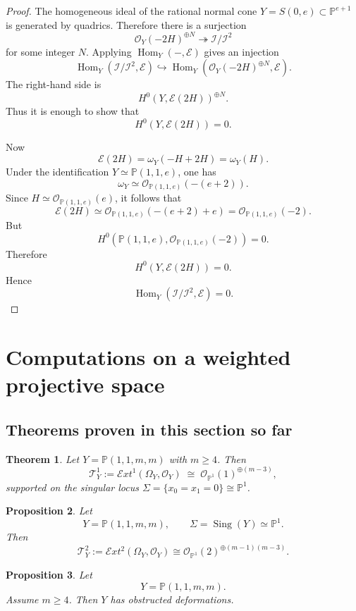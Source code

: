 \documentclass[11pt,twoside]{amsart}
\theoremstyle{plain}
\numberwithin{equation}{section}
\newtheorem{theorem}{Theorem}[section]
\newtheorem{proposition}[theorem]{Proposition}
\newcommand{\OO}{\mathcal{O}}
\newcommand{\PP}{\mathbb{P}}
\theoremstyle{definition}
\DeclareMathOperator{\Sing}{Sing}
\begin{document}
\begin{proof}
The homogeneous ideal of the rational normal cone $Y=S(0,e)\subset\mathbb{P}^{e+1}$ is generated by quadrics. Therefore there is a surjection
$$
\mathcal{O}_Y(-2H)^{\oplus N}\twoheadrightarrow \mathcal{I}/\mathcal{I}^2
$$
for some integer $N$. Applying $\operatorname{Hom}_Y(-,\mathcal{E})$ gives an injection
$$
\operatorname{Hom}_Y(\mathcal{I}/\mathcal{I}^2,\mathcal{E})
\hookrightarrow
\operatorname{Hom}_Y(\mathcal{O}_Y(-2H)^{\oplus N},\mathcal{E}).
$$
The right-hand side is
$$
H^0(Y,\mathcal{E}(2H))^{\oplus N}.
$$
Thus it is enough to show that
$$
H^0(Y,\mathcal{E}(2H))=0.
$$

Now
$$
\mathcal{E}(2H)=\omega_Y(-H+2H)=\omega_Y(H).
$$
Under the identification $Y\simeq\mathbb{P}(1,1,e)$, one has
$$
\omega_Y\simeq\mathcal{O}_{\mathbb{P}(1,1,e)}(-(e+2)).
$$
Since $H\simeq\mathcal{O}_{\mathbb{P}(1,1,e)}(e)$, it follows that
$$
\mathcal{E}(2H)
\simeq
\mathcal{O}_{\mathbb{P}(1,1,e)}(-(e+2)+e)
= \mathcal{O}_{\mathbb{P}(1,1,e)}(-2).
$$
But
$$
H^0(\mathbb{P}(1,1,e),\mathcal{O}_{\mathbb{P}(1,1,e)}(-2))=0.
$$
Therefore
$$
H^0(Y,\mathcal{E}(2H))=0.
$$
Hence
$$
\operatorname{Hom}_Y(\mathcal{I}/\mathcal{I}^2,\mathcal{E})=0.
$$
\end{proof}



\section{Computations on a weighted projective space}

\subsection{Theorems proven in this section so far}

\begin{theorem}
Let $Y = \PP(1,1,m,m)$ with $m \geq 4$. Then
\[
\mathcal{T}^1_Y:=\mathcal{E}xt^1(\Omega_Y, \OO_Y) \;\cong\; \OO_{\PP^1}(1)^{\oplus(m-3)},
\]
supported on the singular locus $\Sigma = \{x_0 = x_1 = 0\} \cong \PP^1$.
\end{theorem}

\begin{proposition}
Let
\[
Y=\PP(1,1,m,m),
\qquad
\Sigma=\Sing(Y)\simeq \PP^1.
\]
Then
\[
\mathcal{T}^2_Y:=\mathcal{E}xt^2(\Omega_Y,\OO_Y)
\cong
\OO_{\PP^1}(2)^{\oplus (m-1)(m-3)}.
\]
\end{proposition}


\begin{proposition}
Let
\[
Y=\mathbb{P}(1,1,m,m).
\]
Assume \(m\geq 4\). Then \(Y\) has obstructed deformations.
\end{proposition}
\end{document}
